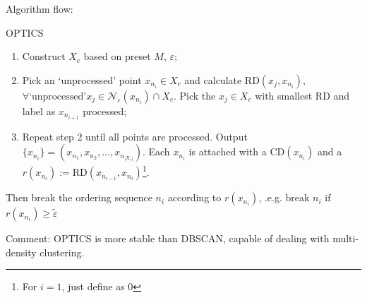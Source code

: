         
    Algorithm flow:
\begin{algorithm}{OPTICS }

\begin{enumerate}[topsep=2pt,itemsep=2pt]
    \item Construct $ X_c $ based on preset $ M $, $ \varepsilon  $;
    \item Pick an `unprocessed' point $ x_{n_i}\in X_c $ and calculate $ \mathrm{RD}(x_j,x_{n_i} ) $, $ \forall \text{`unprocessed'} x_j\in \mathcal{N}_\varepsilon (x_{n_i}) \cap X_c $. Pick the $ x_j\in X_c $ with smallest RD and label as $ x_{n_{i+1}} $ processed;
    \item Repeat step 2 until all points are processed. Output $ \{x_{n_i}\}=(x_{n_1},x_{n_2},\ldots,x_{n_{|X_c|}}) $. Each $ x_{n_i} $ is attached with a $ \mathrm{CD}(x_{n_i}) $ and a $ r(x_{n_i}):=\mathrm{RD}(x_{n_{i-1}},x_{n_i}) $\footnote{For $ i=1 $, just define as $ 0 $}.
\end{enumerate}
    
\end{algorithm}
    

    Then break the ordering sequence $ n_i $ according to $ r(x_{n_i}) $, .e.g. break $ n_i $ if $ r(x_{n_i})\geq \tilde{\varepsilon } $

    Comment: OPTICS is more stable than DBSCAN, capable of dealing with multi-density clustering.





